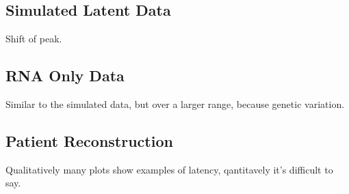 \subsection{Simulated Latent Data} \label{sec:sim_lat_results}
Shift of peak.


\subsection{RNA Only Data} \label{sec:rna_only}
Similar to the simulated data, but over a larger range, because genetic variation.

\subsection{Patient Reconstruction}
Qualitatively many plots show examples of latency, qantitavely it's difficult to say. 

